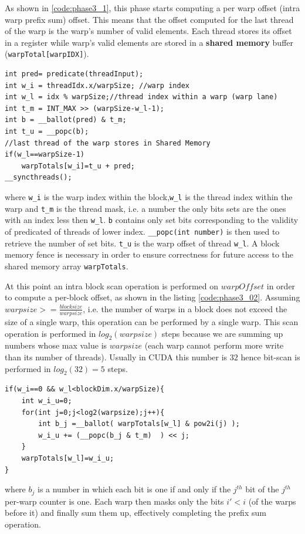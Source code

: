As shown in \ref{code:phase3_1}, this phase starts computing a per warp offset (intra warp prefix sum) offset. This means that the offset computed for the last thread of the warp is the warp's number of valid elements. Each thread  stores its offset in a register while warp's valid elements are stored in a \textbf{shared memory} buffer (\verb|warpTotal[warpIDX]|). 
\begin{lstlisting}
int pred= predicate(threadInput);
int w_i = threadIdx.x/warpSize; //warp index
int w_l = idx % warpSize;//thread index within a warp (warp lane)
int t_m = INT_MAX >> (warpSize-w_l-1);
int b = __ballot(pred) & t_m;
int t_u = __popc(b);
//last thread of the warp stores in Shared Memory
if(w_l==warpSize-1)
	warpTotals[w_i]=t_u + pred;
__syncthreads();
\end{lstlisting}
where \verb|w_i| is the warp index within the block,\verb|w_l| is the thread index within the warp and \verb|t_m| is the thread mask, i.e. a number the only bits sets are the ones with an index less then \verb|w_l|. \verb|b| contains only set bits corresponding to the validity of predicated of threads of lower index. \verb|__popc(int number)| is then used to retrieve the number of set bits. \verb|t_u| is the warp offset of thread \verb|w_l|.
A block memory fence is necessary in order to ensure correctness for future access to the shared memory array \verb|warpTotals|.

At this point an intra block scan operation is performed on \(warpOffset\) in order to compute a per-block offset, as shown in the listing \ref{code:phase3_02}. Assuming \( warpsize >= \frac{blocksize}{warpsize} \), i.e. the number of warps in a block does not exceed the size of a single warp, this operation can be performed by a single warp. This scan operation is performed in \(log_2(warpsize)\) steps because we are summing up numbers whose max value is $warpsize$ (each warp cannot perform more write than its number of threads). Usually in CUDA this number is $32$ hence bit-scan is performed in \(log_2(32)=5\) steps.
\begin{lstlisting}
if(w_i==0 && w_l<blockDim.x/warpSize){
	int w_i_u=0;
	for(int j=0;j<log2(warpsize);j++){
		int b_j =__ballot( warpTotals[w_l] & pow2i(j) );
		w_i_u += (__popc(b_j & t_m)  ) << j;
	}
	warpTotals[w_l]=w_i_u;
}
\end{lstlisting}
where \(b_j\) is a number in which each bit is one if and only if the \(j^{th}\) bit of the \(j^{th}\) per-warp counter  is one.
Each warp then masks only the bits \(i'< i\) (of the warps before it)
and finally sum them up, effectively completing the prefix sum operation.



